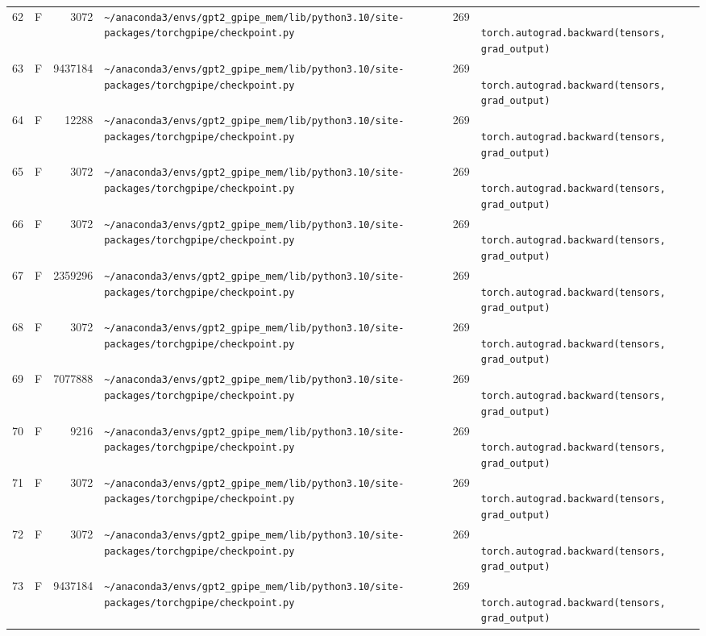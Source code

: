 \documentclass{article}
\begin{document}
\begin{longtable}{r l r p{6.5cm} r p{7.0cm}}
62 & F & 3072 & \lstinline|~/anaconda3/envs/gpt2_gpipe_mem/lib/python3.10/site-packages/torchgpipe/checkpoint.py| & 269 & \lstinline|            torch.autograd.backward(tensors, grad_output)| \\
63 & F & 9437184 & \lstinline|~/anaconda3/envs/gpt2_gpipe_mem/lib/python3.10/site-packages/torchgpipe/checkpoint.py| & 269 & \lstinline|            torch.autograd.backward(tensors, grad_output)| \\
64 & F & 12288 & \lstinline|~/anaconda3/envs/gpt2_gpipe_mem/lib/python3.10/site-packages/torchgpipe/checkpoint.py| & 269 & \lstinline|            torch.autograd.backward(tensors, grad_output)| \\
65 & F & 3072 & \lstinline|~/anaconda3/envs/gpt2_gpipe_mem/lib/python3.10/site-packages/torchgpipe/checkpoint.py| & 269 & \lstinline|            torch.autograd.backward(tensors, grad_output)| \\
66 & F & 3072 & \lstinline|~/anaconda3/envs/gpt2_gpipe_mem/lib/python3.10/site-packages/torchgpipe/checkpoint.py| & 269 & \lstinline|            torch.autograd.backward(tensors, grad_output)| \\
67 & F & 2359296 & \lstinline|~/anaconda3/envs/gpt2_gpipe_mem/lib/python3.10/site-packages/torchgpipe/checkpoint.py| & 269 & \lstinline|            torch.autograd.backward(tensors, grad_output)| \\
68 & F & 3072 & \lstinline|~/anaconda3/envs/gpt2_gpipe_mem/lib/python3.10/site-packages/torchgpipe/checkpoint.py| & 269 & \lstinline|            torch.autograd.backward(tensors, grad_output)| \\
69 & F & 7077888 & \lstinline|~/anaconda3/envs/gpt2_gpipe_mem/lib/python3.10/site-packages/torchgpipe/checkpoint.py| & 269 & \lstinline|            torch.autograd.backward(tensors, grad_output)| \\
70 & F & 9216 & \lstinline|~/anaconda3/envs/gpt2_gpipe_mem/lib/python3.10/site-packages/torchgpipe/checkpoint.py| & 269 & \lstinline|            torch.autograd.backward(tensors, grad_output)| \\
71 & F & 3072 & \lstinline|~/anaconda3/envs/gpt2_gpipe_mem/lib/python3.10/site-packages/torchgpipe/checkpoint.py| & 269 & \lstinline|            torch.autograd.backward(tensors, grad_output)| \\
72 & F & 3072 & \lstinline|~/anaconda3/envs/gpt2_gpipe_mem/lib/python3.10/site-packages/torchgpipe/checkpoint.py| & 269 & \lstinline|            torch.autograd.backward(tensors, grad_output)| \\
73 & F & 9437184 & \lstinline|~/anaconda3/envs/gpt2_gpipe_mem/lib/python3.10/site-packages/torchgpipe/checkpoint.py| & 269 & \lstinline|            torch.autograd.backward(tensors, grad_output)| \\

\end{longtable}
\end{document}
